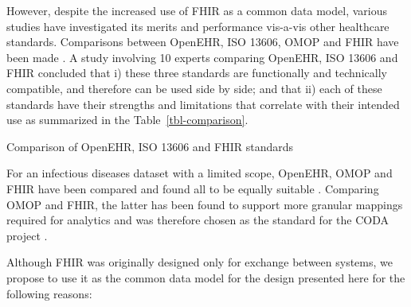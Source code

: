 \documentclass[
  authoryear]{elsarticle}
\begin{document}
However, despite the increased use of FHIR as a common data model,
various studies have investigated its merits and performance vis-a-vis
other healthcare standards. Comparisons between OpenEHR, ISO 13606, OMOP
and FHIR have been made
\citep{ayaz2023transforming, mullie2023coda, rinaldi2021openehr, cremonesi2023need, sinaci2023data}.
A study involving 10 experts comparing OpenEHR, ISO 13606 and FHIR
concluded that i) these three standards are functionally and technically
compatible, and therefore can be used side by side; and that ii) each of
these standards have their strengths and limitations that correlate with
their intended use as summarized in the Table~\ref{tbl-comparison}.

\begin{table}

\caption{\label{tbl-comparison}Comparison of OpenEHR, ISO 13606 and FHIR
standards}


\end{table}%

For an infectious diseases dataset with a limited scope, OpenEHR, OMOP
and FHIR have been compared and found all to be equally suitable
\citep{rinaldi2021openehr}. Comparing OMOP and FHIR, the latter has been
found to support more granular mappings required for analytics and was
therefore chosen as the standard for the CODA project
\citep{mullie2023coda}.

Although FHIR was originally designed only for exchange between systems,
we propose to use it as the common data model for the design presented
here for the following reasons:
\end{document}

